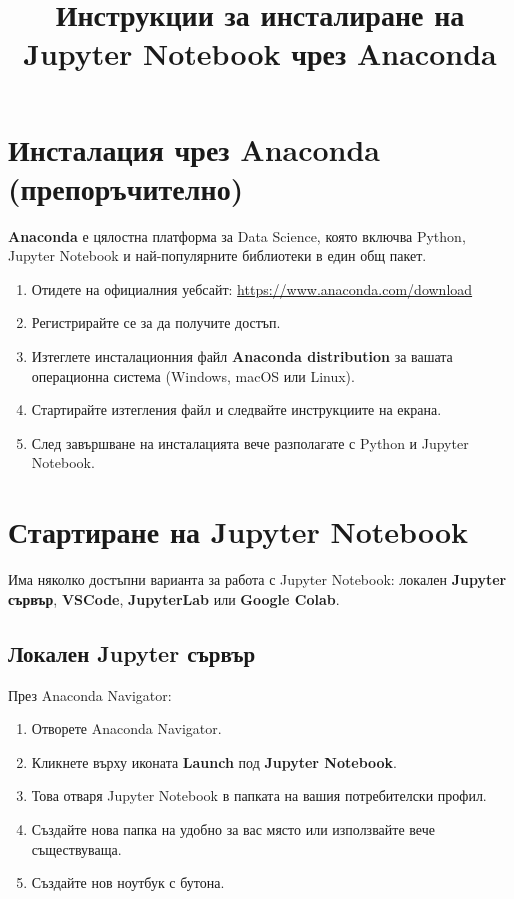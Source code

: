 \documentclass[11pt, a4paper]{article}
\title{\Large\bfseries Инструкции за инсталиране на Jupyter Notebook чрез Anaconda}
\date{}
\begin{document}
\maketitle

\section{Инсталация чрез Anaconda (препоръчително)}
\textbf{Anaconda} е цялостна платформа за Data Science, която включва Python, Jupyter Notebook и най-популярните библиотеки в един общ пакет.

\begin{enumerate}
    \item Отидете на официалния уебсайт: \url{https://www.anaconda.com/download}
    \item Регистрирайте се за да получите достъп.
    \item Изтеглете инсталационния файл \textbf{Anaconda distribution} за вашата операционна система (Windows, macOS или Linux).
    \item Стартирайте изтегления файл и следвайте инструкциите на екрана.
    \item След завършване на инсталацията вече разполагате с Python и Jupyter Notebook.
\end{enumerate}

\section{Стартиране на Jupyter Notebook}

Има няколко достъпни варианта за работа с Jupyter Notebook: локален \textbf{Jupyter сървър}, \textbf{VSCode}, \textbf{JupyterLab} или \textbf{Google Colab}.

\subsection{Локален Jupyter сървър}

През Anaconda Navigator:
\begin{enumerate}
    \item Отворете Anaconda Navigator.
    \item Кликнете върху иконата \textbf{Launch} под \textbf{Jupyter Notebook}.
    \item Това отваря Jupyter Notebook в папката на вашия потребителски профил.
    \item Създайте нова папка на удобно за вас място или използвайте вече съществуваща.
    \item Създайте нов ноутбук с \circ{\plus} бутона.
\end{enumerate}
\end{document}
